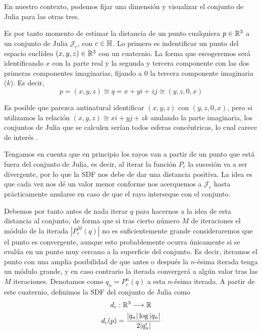 En nuestro contexto, podemos fijar una dimensión y visualizar el conjunto de Julia para las otras tres. 

Es por tanto momento de estimar la distancia de un punto cualquiera $p\in\mathbb{R}^3$ a un conjunto de Julia $\mathcal{J}_c$, con $c\in\mathbb{H}$. Lo primero es indentificar un punto del espacio euclídeo $(x,y,z)\in\mathbb{R}^3$ con un cuaternio. La forma que escogeremos será identificando $x$ con la parte real y la segunda y tercera componente con las dos primeras componentes imaginarias, fijando a $0$ la tercera componente imaginaria ($k$). Es decir,
\begin{equation}
    p=(x,y,z)\cong q = x + yi + zj \cong (y,z,0,x)
\end{equation}

Es posible que parezca antinatural identificar $(x,y,z)$ con $(y,z,0,x)$, pero si utilizamos la relación $(x,y,z)\cong xi+yj+zk$ anulando la parte imaginaria, los conjuntos de Julia que se calculen serían todos esferas concéntricas, lo cual carece de interés \cite{Hart-1989}.

Tengamos en cuenta que en principio los rayos van a partir de un punto que está fuera del conjunto de Julia, es decir, al iterar la función $P_c$ la sucesión va a ser divergente, por lo que la SDF nos debe de dar una distancia positiva. La idea es que cada vez nos dé un valor menor conforme nos acerquemos a $\mathcal{J}_c$ hasta prácticamente anularse en caso de que el rayo interseque con el conjunto. 

Debemos por tanto antes de nada iterar $q$ para hacernos a la idea de esta distancia al conjunto, de forma que si tras cierto número $M$ de iteraciones el módulo de la iterada $|P_c^M(q)|$ no es suficientemente grande consideraremos que el punto es convergente, aunque esto probablemente ocurra únicamente si se evalúa en un punto muy cercano a la superficie del conjunto. Es decir, iteramos el punto con una amplia posibilidad de que antes o después la $n$-ésima iterada tenga un módulo grande, y en caso contrario la iterada convergerá a algún valor tras las $M$ iteraciones. Denotamos como $q_n=P_c^n(q)$ a esta $n$-ésima iterada. A partir de este cuaternio, definimos la SDF del conjunto de Julia como 
\begin{equation}
    \label{eq:SDF-Julia}
    \begin{split}
        d_c&:\mathbb{R}^3\longrightarrow\mathbb{R} \\
        d_c(p) &= \dfrac{|q_n|\log|q_n|}{2|q'_n|}
    \end{split}
\end{equation}

